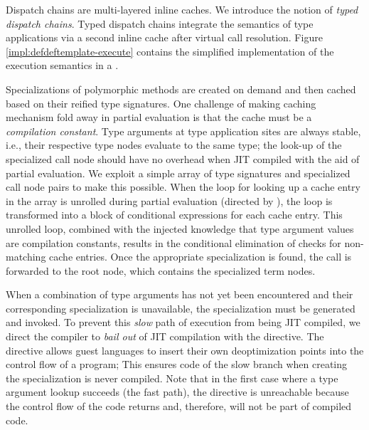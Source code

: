 Dispatch chains\cite{trufflyruby:specialization} are multi-layered inline caches.
We introduce the notion of \textit{typed dispatch chains}.
Typed dispatch chains integrate the semantics of type applications via a second inline cache after virtual call resolution.
Figure \ref{impl:defdeftemplate-execute} contains the simplified implementation of the execution semantics in a .

Specializations of polymorphic methods are created on demand and then cached based on their reified type signatures.
One challenge of making caching mechanism fold away in partial evaluation is that the cache must be a \textit{compilation constant}.
Type arguments at type application sites are always stable, i.e., their respective type nodes evaluate to the same type; the look-up of the specialized call node should have no overhead when JIT compiled with the aid of partial evaluation. 
We exploit a simple array of type signatures and specialized call node pairs to make this possible.
When the loop for looking up a cache entry in the array is unrolled during partial evaluation (directed by ), the loop is transformed into a block of conditional expressions for each cache entry.
This unrolled loop, combined with the injected knowledge that type argument values are compilation constants, results in the conditional elimination\cite{conditional-elim} of checks for non-matching cache entries.
Once the appropriate specialization is found, the call is forwarded to the root node, which contains the specialized term nodes.

When a combination of type arguments has not yet been encountered and their corresponding specialization is unavailable, the specialization must be generated and invoked.
To prevent this \textit{slow} path of execution from being JIT compiled, we direct the compiler to \textit{bail out} of JIT compilation with the  directive.
The directive allows guest languages to insert their own deoptimization points into the control flow of a program;
This ensures code of the slow branch when creating the specialization is never compiled.
Note that in the first case where a type argument lookup succeeds (the fast path), the directive is unreachable because the control flow of the code returns and, therefore, will not be part of compiled code.

